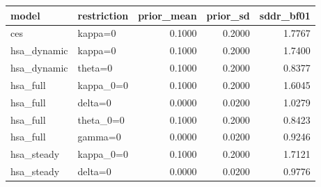 \begin{tabular}{llrrr}
\toprule
model & restriction & prior\_mean & prior\_sd & sddr\_bf01 \\
\midrule
ces & kappa=0 & 0.1000 & 0.2000 & 1.7767 \\
hsa\_dynamic & kappa=0 & 0.1000 & 0.2000 & 1.7400 \\
hsa\_dynamic & theta=0 & 0.1000 & 0.2000 & 0.8377 \\
hsa\_full & kappa\_0=0 & 0.1000 & 0.2000 & 1.6045 \\
hsa\_full & delta=0 & 0.0000 & 0.0200 & 1.0279 \\
hsa\_full & theta\_0=0 & 0.1000 & 0.2000 & 0.8423 \\
hsa\_full & gamma=0 & 0.0000 & 0.0200 & 0.9246 \\
hsa\_steady & kappa\_0=0 & 0.1000 & 0.2000 & 1.7121 \\
hsa\_steady & delta=0 & 0.0000 & 0.0200 & 0.9776 \\
\bottomrule
\end{tabular}
